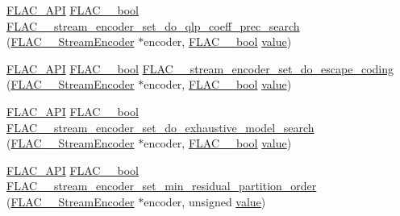 \begin{DoxyCompactItemize}
\item 
\mbox{\hyperlink{group__flac__export_ga56ca07df8a23310707732b1c0007d6f5}{F\+L\+A\+C\+\_\+\+A\+PI}} \mbox{\hyperlink{ordinals_8h_a95103469f1cbd78b8cf250194985b34e}{F\+L\+A\+C\+\_\+\+\_\+bool}} \mbox{\hyperlink{group__flac__stream__encoder_ga3aa94a1aec1cf40c37e54434c86bb50d}{F\+L\+A\+C\+\_\+\+\_\+stream\+\_\+encoder\+\_\+set\+\_\+do\+\_\+qlp\+\_\+coeff\+\_\+prec\+\_\+search}} (\mbox{\hyperlink{struct_f_l_a_c_____stream_encoder}{F\+L\+A\+C\+\_\+\+\_\+\+Stream\+Encoder}} $\ast$encoder, \mbox{\hyperlink{ordinals_8h_a95103469f1cbd78b8cf250194985b34e}{F\+L\+A\+C\+\_\+\+\_\+bool}} \mbox{\hyperlink{_s_d_l__opengl__glext_8h_a8ad81492d410ff2ac11f754f4042150f}{value}})
\item 
\mbox{\hyperlink{group__flac__export_ga56ca07df8a23310707732b1c0007d6f5}{F\+L\+A\+C\+\_\+\+A\+PI}} \mbox{\hyperlink{ordinals_8h_a95103469f1cbd78b8cf250194985b34e}{F\+L\+A\+C\+\_\+\+\_\+bool}} \mbox{\hyperlink{group__flac__stream__encoder_gaa839d19b6d1b30ba0407d419bdb6fe67}{F\+L\+A\+C\+\_\+\+\_\+stream\+\_\+encoder\+\_\+set\+\_\+do\+\_\+escape\+\_\+coding}} (\mbox{\hyperlink{struct_f_l_a_c_____stream_encoder}{F\+L\+A\+C\+\_\+\+\_\+\+Stream\+Encoder}} $\ast$encoder, \mbox{\hyperlink{ordinals_8h_a95103469f1cbd78b8cf250194985b34e}{F\+L\+A\+C\+\_\+\+\_\+bool}} \mbox{\hyperlink{_s_d_l__opengl__glext_8h_a8ad81492d410ff2ac11f754f4042150f}{value}})
\item 
\mbox{\hyperlink{group__flac__export_ga56ca07df8a23310707732b1c0007d6f5}{F\+L\+A\+C\+\_\+\+A\+PI}} \mbox{\hyperlink{ordinals_8h_a95103469f1cbd78b8cf250194985b34e}{F\+L\+A\+C\+\_\+\+\_\+bool}} \mbox{\hyperlink{group__flac__stream__encoder_ga7fbc05ec9abd249a400fccb9f189e55e}{F\+L\+A\+C\+\_\+\+\_\+stream\+\_\+encoder\+\_\+set\+\_\+do\+\_\+exhaustive\+\_\+model\+\_\+search}} (\mbox{\hyperlink{struct_f_l_a_c_____stream_encoder}{F\+L\+A\+C\+\_\+\+\_\+\+Stream\+Encoder}} $\ast$encoder, \mbox{\hyperlink{ordinals_8h_a95103469f1cbd78b8cf250194985b34e}{F\+L\+A\+C\+\_\+\+\_\+bool}} \mbox{\hyperlink{_s_d_l__opengl__glext_8h_a8ad81492d410ff2ac11f754f4042150f}{value}})
\item 
\mbox{\hyperlink{group__flac__export_ga56ca07df8a23310707732b1c0007d6f5}{F\+L\+A\+C\+\_\+\+A\+PI}} \mbox{\hyperlink{ordinals_8h_a95103469f1cbd78b8cf250194985b34e}{F\+L\+A\+C\+\_\+\+\_\+bool}} \mbox{\hyperlink{group__flac__stream__encoder_gae3e2dd204f276d051bf1a118383bfda2}{F\+L\+A\+C\+\_\+\+\_\+stream\+\_\+encoder\+\_\+set\+\_\+min\+\_\+residual\+\_\+partition\+\_\+order}} (\mbox{\hyperlink{struct_f_l_a_c_____stream_encoder}{F\+L\+A\+C\+\_\+\+\_\+\+Stream\+Encoder}} $\ast$encoder, unsigned \mbox{\hyperlink{_s_d_l__opengl__glext_8h_a8ad81492d410ff2ac11f754f4042150f}{value}})

\end{DoxyCompactItemize}

